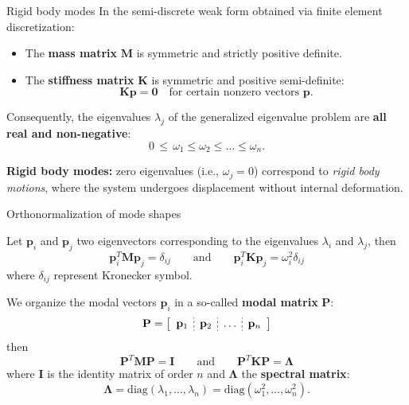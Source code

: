 \documentclass[aspectratio=169]{beamer}
\begin{document}
{  \begin{frame}{Rigid body modes}
    In the semi-discrete weak form obtained via finite element discretization:
    \begin{itemize}
      \item The \textbf{mass matrix} \( \mathbf{M} \) is symmetric and strictly positive definite.
      \item The \textbf{stiffness matrix} \( \mathbf{K} \) is symmetric and positive semi-definite:
            \[
              \mathbf{K} \mathbf{p} = \mathbf{0} \quad \text{for certain nonzero vectors } \mathbf{p}.
            \]
    \end{itemize}
    Consequently, the eigenvalues \( \lambda_j\) of the generalized eigenvalue problem are \textbf{all real and non-negative}:
    \[
      0 \,\leq\, \omega_1 \leq \omega_2 \leq \dots \leq \omega_n.
    \]
    \begin{tcolorbox}[colback=darkred!10,colframe=darkred!40!black]
      \textbf{Rigid body modes:} zero eigenvalues (i.e., \( \omega_j = 0 \)) correspond to \emph{rigid body motions}, where the system undergoes displacement without internal deformation.
    \end{tcolorbox}
  \end{frame}

  \begin{frame}{Orthonormalization of mode shapes}
    \small
    \begin{block}{}
      Let $\mathbf p_i$ and $\mathbf p_j$ two eigenvectors corresponding to the  eigenvalues $\lambda_i$ and $\lambda_j$, then
      $$
        \mathbf p_i^T\mathbf M\mathbf p_j  =\delta_{ij}
        \qquad\text{and}\qquad
        \mathbf p_i^T\mathbf K\mathbf p_j  =\omega_i^2\delta_{ij}
      $$
      where $\delta_{ij}$ represent Kronecker symbol.
    \end{block}
    \begin{tcolorbox}[colback=darkred!10,colframe=darkred!40!black]
      We organize the modal vectors $\mathbf p_i$ in a so-called \textbf{modal matrix} $\mathbf P$:
      $$\mathbf P=\left[ \begin{array}{c;{2pt/2pt}c;{2pt/2pt}c;{2pt/2pt}c}
            \mathbf p_{1} & \mathbf p_{2} & \dots & \mathbf p_{n} \\
          \end{array}\right]$$
      then
      $$  \mathbf P^T\mathbf M\mathbf P  =\mathbf I       \qquad\text{and}\qquad
        \mathbf P^T\mathbf K\mathbf P  =\mathbf\Lambda$$
      where $\mathbf I$ is the identity matrix of order $n$ and $\mathbf\Lambda$ the \textbf{spectral matrix}:
      $$\mathbf\Lambda=\text{diag}(\lambda_1,\dots,\lambda_n)=\text{diag}(\omega_1^2,\dots,\omega_n^2).$$
    \end{tcolorbox}
  \end{frame}


}
\end{document}
